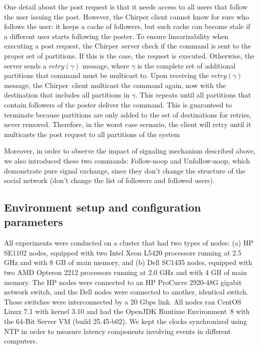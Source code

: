 \documentclass[11pt]{article}
\newcommand{\appname}{Chirper} %
\begin{document}
One detail about the post request is that it needs access to all users that follow the user issuing the post.
However, the \appname{} client cannot know for sure who follows the user: it keeps a cache of followers, but such cache can become stale if a different user starts following the poster.
To ensure linearizability when executing a post request, the \appname\ server check if the command is sent to the proper set of partitions. If this is the case, the request is executed.
Otherwise, the server sends a $retry(\gamma)$ message, where $\gamma$ is the complete set of additional partitions that command must be multicast to. Upon receiving the $retry(\gamma)$ message, the \appname\ client multicast the command again, now with the destination that includes all partitions in $\gamma$. This repeats until all partitions that contain followers of the poster deliver the command. This is guaranteed to terminate because partitions are only added to the set of destinations for retries, never removed. Therefore, in the worst case scenario, the client will retry until it multicasts the post request to all partitions of the system

Moreover, in order to observe the impact of signaling mechanism described above, we also introduced these two commands: Follow-noop and Unfollow-noop, which demonstrate pure signal exchange, since they don't change the structure of the social network (don't change the list of followers and followed users).

\label{sec:evaluation:app}
\subsection{Environment setup and configuration parameters}

All experiments were conducted on a cluster that had two types of nodes: (a) HP SE1102 nodes, equipped with two Intel Xeon L5420 processors running at 2.5 GHz and with 8 GB of main memory, and (b) Dell SC1435 nodes, equipped with two AMD Opteron 2212 processors running at 2.0 GHz and with 4 GB of main memory. The HP nodes were connected to an HP ProCurve 2920-48G gigabit network switch, and the Dell nodes were connected to another, identical switch. Those switches were interconnected by a 20 Gbps link.
All nodes ran CentOS Linux 7.1 with kernel 3.10 and had the OpenJDK Runtime Environment~8 with the \mbox{64-Bit} Server VM (build 25.45-b02).
We kept the clocks synchronized using NTP in order to measure latency components involving events in different computers.
\end{document}
